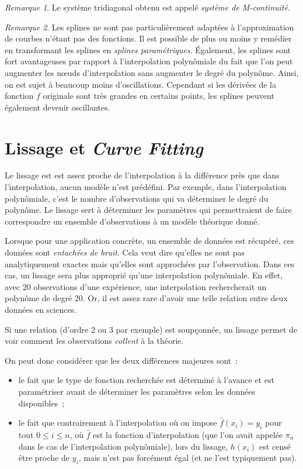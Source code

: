 \documentclass{article}
\theoremstyle{definition}
\theoremstyle{remark}
\newtheorem*{rmq}{Remarque}
\begin{document}
		\begin{rmq} Le système tridiagonal obtenu est appelé \emph{système de M-continuité}. \end{rmq}

		\begin{rmq} Les splines ne sont pas particulièrement adaptées à l'approximation de courbes n'étant pas des fonctions. Il est possible de plus ou moins
		y remédier en transformant les splines en \emph{splines paramétriques}. Également, les splines sont fort avantageuses par rapport à l'interpolation
		polynômiale du fait que l'on peut augmenter les nœuds d'interpolation sans augmenter le degré du polynôme. Ainsi, on est sujet à beaucoup moins
		d'oscillations. Cependant si les dérivées de la fonction $f$ originale sont très grandes en certains points, les splines peuvent également devenir
		oscillantes.
		\end{rmq}

\newpage
\section{Lissage et \emph{Curve Fitting}}
		Le lissage est est assez proche de l'interpolation à la différence près que dans l'interpolation, aucun modèle n'est prédéfini. Par exemple, dans
		l'interpolation polynômiale, c'est le nombre d'observations qui va déterminer le degré du polynôme. Le lissage sert à déterminer les paramètres qui
		permettraient de faire correspondre un ensemble d'observations à un modèle théorique donné.

		Lorsque pour une application concrète, un ensemble de données est récupéré, ces données sont \emph{entachées de bruit}. Cela veut dire qu'elles ne sont
		pas analytiquement exactes mais qu'elles sont approchées par l'observation. Dans ces cas, un lissage sera plus approprié qu'une interpolation polynômiale.
		En effet, avec 20 observations d'une expérience, une interpolation rechercherait un polynôme de degré 20. Or, il est assez rare d'avoir une telle
		relation entre deux données en sciences.

		Si une relation (d'ordre 2 ou 3 par exemple) est soupçonnée, un lissage permet de voir comment les observations \emph{collent} à la théorie.

		On peut donc considérer que les deux différences majeures sont~:
		\begin{itemize}
			\item le fait que le type de fonction recherchée est déterminé à l'avance et est paramétriser avant de déterminer les paramètres selon les données
			disponibles~;
			\item le fait que contrairement à l'interpolation où on impose $\hat f(x_i) = y_i$ pour tout $0 \leq i \leq n$, où $\hat f$ est la fonction
			d'interpolation (que l'on avait appelée $\pi_n$ dans le cas de l'interpolation polynômiale), lors du lissage, $h(x_i)$ est censé être proche
			de $y_i$, mais n'est pas forcément égal (et ne l'est typiquement pas).
		\end{itemize}
\end{document}
